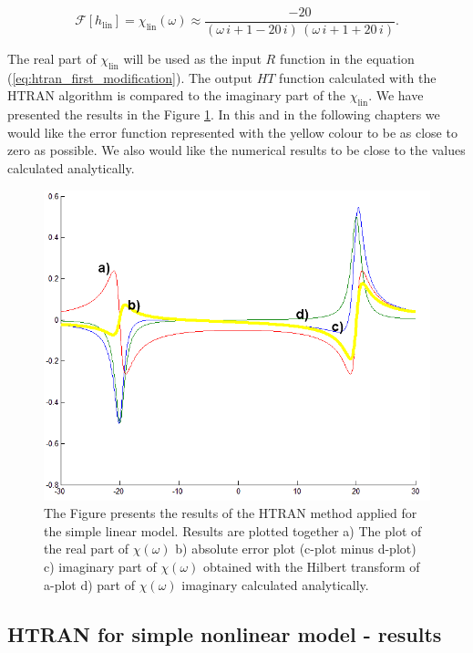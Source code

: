 \documentclass[12pt,twoside,a4paper]{article}
\numberwithin{equation}{subsection}
\numberwithin{figure}{subsection}
\begin{document}
\begin{equation} \label{eq:htran_remind_linmod}
  \mathcal{F}[h_{\text{lin}}] = \chi_{\text{lin}}(\omega) \approx \frac{ -20}{(\omega \,i + 1 -20\,i)\,(\omega \,i + 1 + 20\,i)} .
\end{equation}

The real part of $\chi_{\text{lin}}$ will be used as the input $R$ function in the equation (\ref{eq:htran_first_modification}). The
output $HT$ function calculated with the HTRAN algorithm is compared to the imaginary part of the $\chi_{\text{lin}}$. We have presented the
results in the Figure \ref{eq:htran_lin}. In this and in the following chapters we would like the error function
represented with the yellow colour to be as close to zero as possible. We also would like the numerical results to be close to the
values calculated analytically.

\begin{figure} 
  \includegraphics[width=150mm]{img/htran_lin.png}
  \caption{The Figure presents the results of the HTRAN method applied for the simple linear model. Results are plotted together 
   a) The plot of the real part of $\chi (\omega )$ 
   b) absolute error plot (c-plot minus d-plot) 
   c) imaginary part of $\chi (\omega )$ obtained with the Hilbert transform of a-plot 
   d) part of $\chi (\omega )$ imaginary calculated analytically. \label{eq:htran_lin}
  }
\end{figure}

\subsection{HTRAN for simple nonlinear model - results} \label{chap:htran_nlo}
\end{document}
